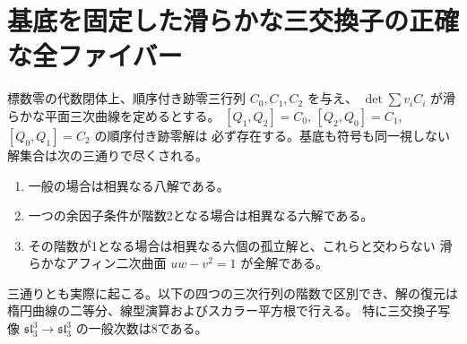 \section{基底を固定した滑らかな三交換子の正確な全ファイバー}
\label{sec:marked-fixed-commutator-adjugate}
\begin{theorem}\label{thm:marked-fixed-commutator-adjugate}
標数零の代数閉体上、順序付き跡零三行列 $C_0,C_1,C_2$ を与え、
$\det\sum v_i C_i$ が滑らかな平面三次曲線を定めるとする。
$[Q_1,Q_2]=C_0$, $[Q_2,Q_0]=C_1$, $[Q_0,Q_1]=C_2$ の順序付き跡零解は
必ず存在する。基底も符号も同一視しない解集合は次の三通りで尽くされる。
\begin{enumerate}
\item 一般の場合は相異なる八解である。
\item 一つの余因子条件が階数2となる場合は相異なる六解である。
\item その階数が1となる場合は相異なる六個の孤立解と、これらと交わらない
滑らかなアフィン二次曲面 $uw-v^2=1$ が全解である。
\end{enumerate}
三通りとも実際に起こる。以下の四つの三次行列の階数で区別でき、解の復元は
楕円曲線の二等分、線型演算およびスカラー平方根で行える。
特に三交換子写像 $\mathfrak{sl}_3^3\to\mathfrak{sl}_3^3$ の一般次数は8である。
\end{theorem}
